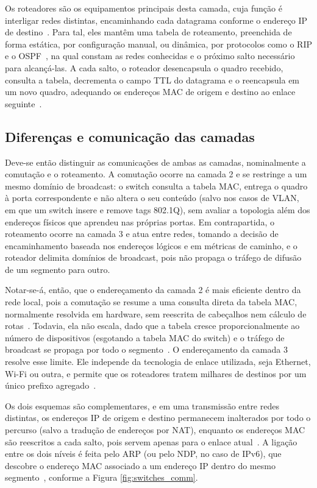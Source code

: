 Os roteadores são os equipamentos principais desta camada, cuja função é interligar redes distintas, encaminhando cada datagrama conforme o endereço IP de destino~\cite{tanenbaum2021redes}. Para tal, eles mantêm uma tabela de roteamento, preenchida de forma estática, por configuração manual, ou dinâmica, por protocolos como o RIP e o OSPF~\cite{RIPandOSPF}, na qual constam as redes conhecidas e o próximo salto necessário para alcançá-las. A cada salto, o roteador desencapsula o quadro recebido, consulta a tabela, decrementa o campo TTL do datagrama e o reencapsula em um novo quadro, adequando os endereços MAC de origem e destino ao enlace seguinte~\cite{tanenbaum2021redes}.

\subsection{Diferenças e comunicação das camadas}
Deve-se então distinguir as comunicações de ambas as camadas, nominalmente a comutação e o roteamento. A comutação ocorre na camada 2 e se restringe a um mesmo domínio de broadcast: o switch consulta a tabela MAC, entrega o quadro à porta correspondente e não altera o seu conteúdo (salvo nos casos de VLAN, em que um switch insere e remove tags 802.1Q), sem avaliar a topologia além dos endereços físicos que aprendeu nas próprias portas. Em contrapartida, o roteamento ocorre na camada 3 e atua entre redes, tomando a decisão de encaminhamento baseada nos endereços lógicos e em métricas de caminho, e o roteador delimita domínios de broadcast, pois não propaga o tráfego de difusão de um segmento para outro.

Notar-se-á, então, que o endereçamento da camada 2 é mais eficiente dentro da rede local, pois a comutação se resume a uma consulta direta da tabela MAC, normalmente resolvida em hardware, sem reescrita de cabeçalhos nem cálculo de rotas~\cite{switches}. Todavia, ela não escala, dado que a tabela cresce proporcionalmente ao número de dispositivos (esgotando a tabela MAC do switch) e o tráfego de broadcast se propaga por todo o segmento~\cite{switches}. O endereçamento da camada 3 resolve esse limite. Ele independe da tecnologia de enlace utilizada, seja Ethernet, Wi-Fi ou outra, e permite que os roteadores tratem milhares de destinos por um único prefixo agregado~\cite{switches}.

Os dois esquemas são complementares, e em uma transmissão entre redes distintas, os endereços IP de origem e destino permanecem inalterados por todo o percurso (salvo a tradução de endereços por NAT), enquanto os endereços MAC são reescritos a cada salto, pois servem apenas para o enlace atual~\cite{switches}. A ligação entre os dois níveis é feita pelo ARP (ou pelo NDP, no caso de IPv6), que descobre o endereço MAC associado a um endereço IP dentro do mesmo segmento~\cite{arp}, conforme a Figura \ref{fig:switches_comm}.


